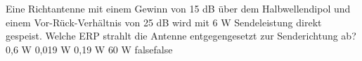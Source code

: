     {Eine Richtantenne mit einem Gewinn von 15 dB über dem Halbwellendipol und einem Vor-Rück-Verhältnis von 25 dB wird mit 6 W Sendeleistung direkt gespeist. Welche ERP strahlt die Antenne entgegengesetzt zur Senderichtung ab?}
    {0,6 W}
    {0,019 W}
    {0,19 W}
    {60 W}
    {false}{false}